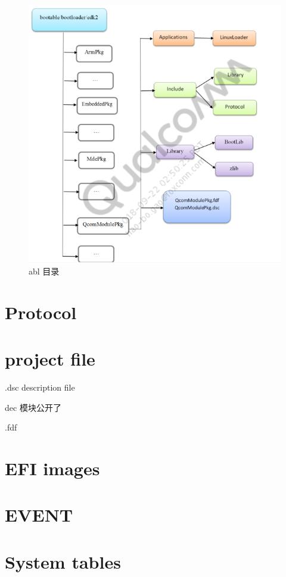 \begin{figure}
\begin{center}
\includegraphics[width=13cm]{img/abldir}
\caption{abl 目录}
\label{abldir}
\end{center}
\vspace{-0.5em}
\end{figure}



\section{Protocol}


\section{project file}


.dsc description file 

dec 模块公开了

.fdf

\section{EFI images}






\section{EVENT}


\section{System tables}